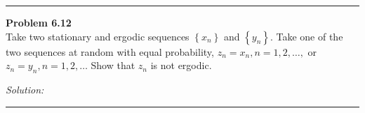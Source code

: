 \documentclass[a4paper, 11pt]{article}
\newenvironment{problem}[2][Problem]
    { \begin{mdframed}[backgroundcolor=gray!20] \textbf{#1 #2} \\}
    {  \end{mdframed}}
\newenvironment{solution}
    {\textit{Solution:}}
    {}
\begin{document}
\noindent\rule{7in}{2.8pt}

\begin{problem}{6.12}
Take two stationary and ergodic sequences $\left\{x_{n}\right\}$ and $\left\{y_{n}\right\} .$ Take one of
the two sequences at random with equal probability, $z_{n}=x_{n}, n=1,2, \ldots,$
or $z_{n}=y_{n}, n=1,2, \ldots$ Show that $z_{n}$ is not ergodic.
\end{problem}
\begin{solution}


\end{solution} 

\noindent\rule{7in}{2.8pt}
\end{document}

